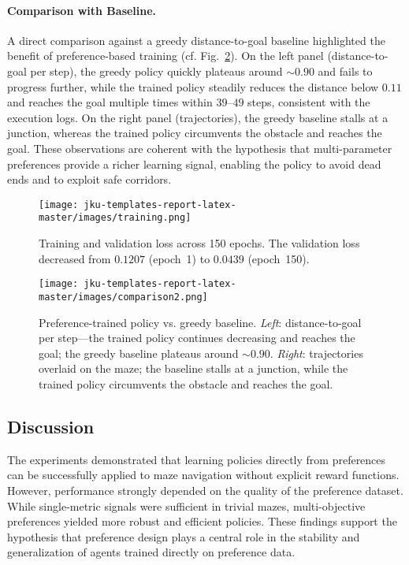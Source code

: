 \documentclass[a4paper,oneside,10pt,ngerman,english]{scrartcl}
\begin{document}
\paragraph{Comparison with Baseline.}
A direct comparison against a greedy distance-to-goal baseline highlighted the benefit of preference-based training (cf. Fig.~\ref{fig:comparison}). On the left panel (distance-to-goal per step), the greedy policy quickly plateaus around $\sim 0.90$ and fails to progress further, while the trained policy steadily reduces the distance below $0.11$ and reaches the goal multiple times within $39$--$49$ steps, consistent with the execution logs. On the right panel (trajectories), the greedy baseline stalls at a junction, whereas the trained policy circumvents the obstacle and reaches the goal. These observations are coherent with the hypothesis that multi-parameter preferences provide a richer learning signal, enabling the policy to avoid dead ends and to exploit safe corridors.

\begin{figure}[H]
  \centering
  \texttt{[image: jku-templates-report-latex-master/images/training.png]}
  \caption{Training and validation loss across 150 epochs. The validation loss decreased from $0.1207$ (epoch~1) to $0.0439$ (epoch~150).}
  \label{fig:training_curve}
\end{figure}

\begin{figure}[H]
  \centering
  \texttt{[image: jku-templates-report-latex-master/images/comparison2.png]}
  \caption{Preference-trained policy vs. greedy baseline. \emph{Left}: distance-to-goal per step---the trained policy continues decreasing and reaches the goal; the greedy baseline plateaus around $\sim 0.90$. \emph{Right}: trajectories overlaid on the maze; the baseline stalls at a junction, while the trained policy circumvents the obstacle and reaches the goal.}
  \label{fig:comparison}
\end{figure}

\subsection{Discussion}

The experiments demonstrated that learning policies directly from preferences can be successfully applied to maze navigation without explicit reward functions.
However, performance strongly depended on the quality of the preference dataset.
While single-metric signals were sufficient in trivial mazes, multi-objective preferences yielded more robust and efficient policies.
These findings support the hypothesis that preference design plays a central role in the stability and generalization of agents trained directly on preference data.
\end{document}

